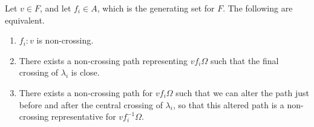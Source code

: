 \begin{lemma}
	\label{lem:reflection_close_turns}
	Let $v \in F$, and let $f_i \in A$, which is the generating set for $F$.
	The following are equivalent.
	\begin{enumerate}
		\item $f_i : v$ is non-crossing.
		\item There exists a non-crossing path representing $vf_i\Omega$ such that the final crossing of $\lambda_i$ is close.
		\item There exists a non-crossing path for $vf_i \Omega$ such that we can alter the path just before and after the central crossing of $\lambda_i$, so that this altered path is a non-crossing representative for $vf_i^{-1} \Omega$.
	\end{enumerate}
\end{lemma}
